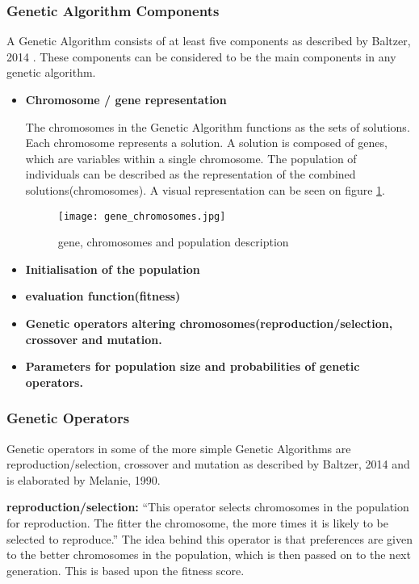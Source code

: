 \subsubsection{Genetic Algorithm Components}

A Genetic Algorithm consists of at least five components as described by Baltzer, 2014 \cite{Baltzer2014}. These components can be considered to be the main components in any genetic algorithm.
\begin{itemize}
\item \textbf{Chromosome / gene representation}

The chromosomes in the Genetic Algorithm functions as the sets of solutions. Each chromosome represents a solution. A solution is composed of genes, which are variables within a single chromosome. The population of individuals can be described as the representation of the combined solutions(chromosomes). A visual representation can be seen on figure \ref{fig:gene}.
\begin{figure}
\centering
\texttt{[image: gene\_chromosomes.jpg]}
\caption{gene, chromosomes and population description}
\label{fig:gene}
\end{figure}

\item \textbf{Initialisation of the population}
\item \textbf{evaluation function(fitness)}
\item \textbf{Genetic operators altering chromosomes(reproduction/selection, crossover and mutation.}
\item \textbf{Parameters for population size and probabilities of genetic operators.}
\end{itemize}



\subsubsection{Genetic Operators}
Genetic operators in some of the more simple Genetic Algorithms are reproduction/selection, crossover and mutation as described by Baltzer, 2014 and is elaborated by Melanie, 1990. \cite{Melanie1990}

\textbf{reproduction/selection:} \enquote{This operator selects chromosomes in the population for reproduction. The fitter the chromosome, the more times it is likely to be selected to reproduce.} \cite[pp. 8]{Melanie1990}
The idea behind this operator is that preferences are given to the better chromosomes in the population, which is then passed on to the next generation. This is based upon the fitness score.


